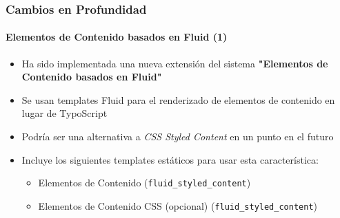\begin{frame}[fragile]
	\frametitle{Cambios en Profundidad}
	\framesubtitle{Elementos de Contenido basados en Fluid (1)}

	\begin{itemize}

		\item Ha sido implementada una nueva extensión del sistema \textbf{"Elementos de Contenido basados en Fluid"}

		\item Se usan templates Fluid para el renderizado de elementos de contenido en lugar de TypoScript

		\item Podría ser una alternativa a \textit{CSS Styled Content} en un punto en el futuro

		\item Incluye los siguientes templates estáticos para usar esta característica:

			\begin{itemize}
				\item Elementos de Contenido (\texttt{fluid\_styled\_content})
				\item Elementos de Contenido CSS (opcional) (\texttt{fluid\_styled\_content})
			\end{itemize}

	\end{itemize}

\end{frame}





